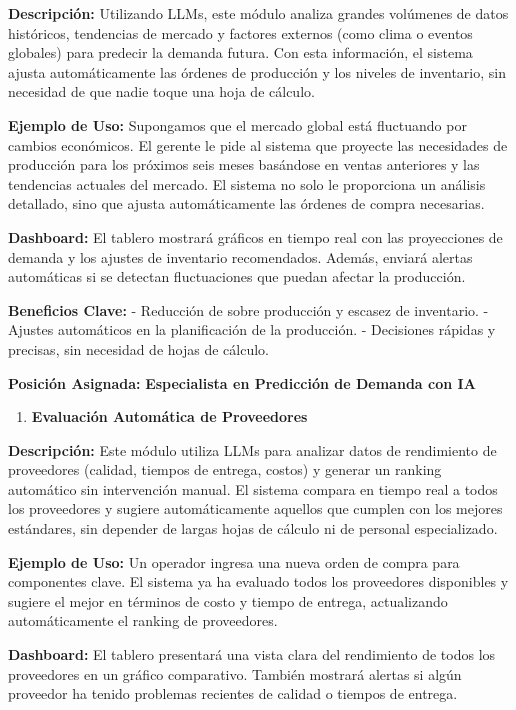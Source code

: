 \documentclass[
  10pt,
  letterpaper,
]{book}
\providecommand{\tightlist}{%
  \setlength{\itemsep}{0pt}\setlength{\parskip}{0pt}}\usepackage{longtable,booktabs,array}
\begin{document}
\textbf{Descripción:} Utilizando LLMs, este módulo analiza grandes
volúmenes de datos históricos, tendencias de mercado y factores externos
(como clima o eventos globales) para predecir la demanda futura. Con
esta información, el sistema ajusta automáticamente las órdenes de
producción y los niveles de inventario, sin necesidad de que nadie toque
una hoja de cálculo.

\textbf{Ejemplo de Uso:} Supongamos que el mercado global está
fluctuando por cambios económicos. El gerente le pide al sistema que
proyecte las necesidades de producción para los próximos seis meses
basándose en ventas anteriores y las tendencias actuales del mercado. El
sistema no solo le proporciona un análisis detallado, sino que ajusta
automáticamente las órdenes de compra necesarias.

\textbf{Dashboard:} El tablero mostrará gráficos en tiempo real con las
proyecciones de demanda y los ajustes de inventario recomendados.
Además, enviará alertas automáticas si se detectan fluctuaciones que
puedan afectar la producción.

\textbf{Beneficios Clave:} - Reducción de sobre producción y escasez de
inventario. - Ajustes automáticos en la planificación de la producción.
- Decisiones rápidas y precisas, sin necesidad de hojas de cálculo.

\textbf{Posición Asignada:} \textbf{Especialista en Predicción de
Demanda con IA}

\begin{enumerate}
\def\labelenumi{\arabic{enumi}.}
\setcounter{enumi}{1}
\tightlist
\item
  \textbf{Evaluación Automática de Proveedores}
\end{enumerate}

\textbf{Descripción:} Este módulo utiliza LLMs para analizar datos de
rendimiento de proveedores (calidad, tiempos de entrega, costos) y
generar un ranking automático sin intervención manual. El sistema
compara en tiempo real a todos los proveedores y sugiere automáticamente
aquellos que cumplen con los mejores estándares, sin depender de largas
hojas de cálculo ni de personal especializado.

\textbf{Ejemplo de Uso:} Un operador ingresa una nueva orden de compra
para componentes clave. El sistema ya ha evaluado todos los proveedores
disponibles y sugiere el mejor en términos de costo y tiempo de entrega,
actualizando automáticamente el ranking de proveedores.

\textbf{Dashboard:} El tablero presentará una vista clara del
rendimiento de todos los proveedores en un gráfico comparativo. También
mostrará alertas si algún proveedor ha tenido problemas recientes de
calidad o tiempos de entrega.
\end{document}

